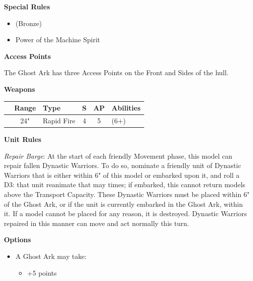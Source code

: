 \begin{minipage}[t]{0.72\textwidth}
\begin{minipage}[t]{0.5\textwidth}
\begin{flushleft}
			\textbf{Special Rules}
			\begin{itemize}
				\item {} (Bronze)
				\item Power of the Machine Spirit
			\end{itemize}
		\end{flushleft}
	\end{minipage}

	\vspace*{2em}
	\textbf{Access Points}
	
	The Ghost Ark has three Access Points on the Front and Sides of the hull.
	
	\vspace*{2em}
	\textbf{Weapons}
	
	\begin{tabular}{L{90 pt} c C{40pt} *{2}{c} >{\raggedright\arraybackslash}p{130pt}}
		& Range & Type & S & AP & Abilities \\
		\hline
		 & 24" & Rapid Fire & 4 & 5 &  (6+) \\
	\end{tabular}
	
	\vspace*{2em}
	\textbf{Unit Rules}
	
	\textit{Repair Barge}: At the start of each friendly Movement phase, this model can repair fallen Dynastic Warriors. To do so, nominate a friendly unit of Dynastic Warriors that is either within 6" of this model or embarked upon it, and roll a D3: that unit reanimate that may times; if embarked, this cannot return models above the Transport Capacity. These Dynastic Warriors must be placed within 6" of the Ghost Ark, or if the unit is currently embarked in the Ghost Ark, within it. If a model cannot be placed for any reason, it is destroyed. Dynastic Warriors repaired in this manner can move and act normally this turn. 
	
	
	\vspace*{2em}
	\textbf{Options}
	\begin{itemize}
	\item A Ghost Ark may take:
	\begin{itemize}
		\item {} \dotfill +5 points
	\end{itemize} 
	\end{itemize} 
\end{minipage}



